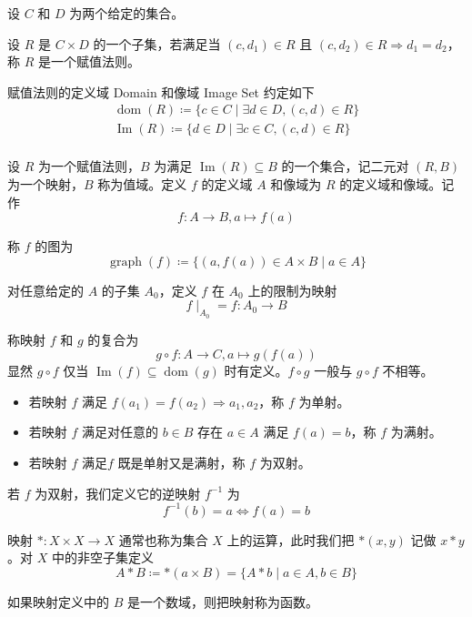 设 $C$ 和 $D$ 为两个给定的集合。

\begin{definition}[赋值法则]
	设 $R$ 是 $C\times D$ 的一个子集，若满足当 $(c,d_1)\in R$ 且 $(c,d_2)\in R \Rightarrow d_1=d_2$，称 $R$ 是一个赋值法则。
\end{definition}

赋值法则的定义域 Domain 和像域 Image Set 约定如下
\[ \begin{aligned}
		\operatorname{dom}(R) \coloneqq  \{c\in C \mid \exists d \in D, (c,d) \in R\} \\
		\operatorname{Im}(R) \coloneqq  \{d\in D \mid \exists c \in C, (c,d) \in R\}  \\
	\end{aligned} \]

\begin{definition}
	设 $R$ 为一个赋值法则，$B$ 为满足 $\operatorname{Im}(R) \subseteq B$ 的一个集合，记二元对 $(R,B)$ 为一个映射，$B$ 称为值域。定义 $f$ 的定义域 $A$ 和像域为 $R$ 的定义域和像域。记作
	\[ f:A\to B, a\mapsto f(a) \]
\end{definition}

称 $f$ 的图为
\[ \operatorname{graph}(f) \coloneqq  \{(a,f(a)) \in A\times B \mid a \in A\}\]

对任意给定的 $A$ 的子集 $A_0$，定义 $f$ 在 $A_0$ 上的限制为映射
\[ f \mid_{A_0} = f : A_0 \to B\]

称映射 $f$ 和 $g$ 的复合为
\[ g\circ f: A \to C, a \mapsto g(f(a))\]
显然 $g \circ f$ 仅当 $\operatorname{Im}(f) \subseteq \operatorname{dom}(g)$ 时有定义。$f\circ g$ 一般与 $g \circ f$ 不相等。

\begin{itemize}
	\item 若映射 $f$ 满足 $f(a_1) = f(a_2) \Rightarrow a_1,a_2$，称 $f$ 为单射。
	\item 若映射 $f$ 满足对任意的 $b\in B$ 存在 $a\in A$ 满足 $f(a)=b$，称 $f$ 为满射。
	\item 若映射 $f$ 满足$f$ 既是单射又是满射，称 $f$ 为双射。
\end{itemize}

若 $f$ 为双射，我们定义它的逆映射 $f^{-1}$ 为
\[ f^{-1}(b) =  a \Leftrightarrow f(a) = b\]

映射 $\ast: X\times X \to X$ 通常也称为集合 $X$ 上的运算，此时我们把 $\ast(x,y)$ 记做 $x \ast y$。对 $X$ 中的非空子集定义
\[ A \ast B \coloneqq  \ast(a\times B) = \{A \ast b \mid a \in A, b\in B\}\]

如果映射定义中的 $B$ 是一个数域，则把映射称为函数。

